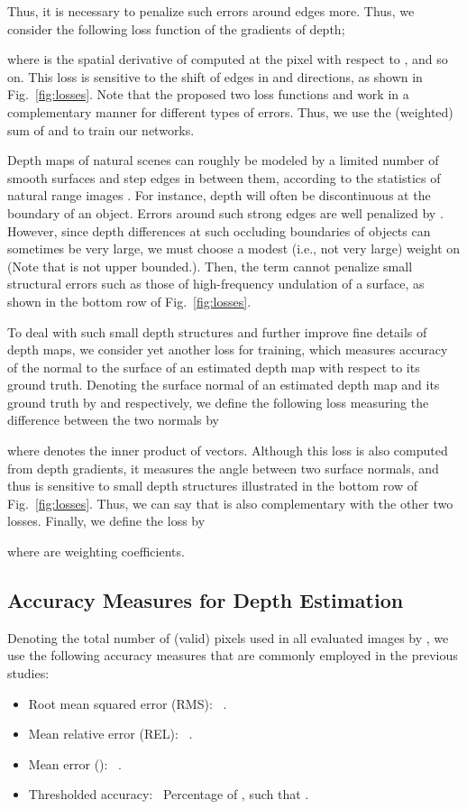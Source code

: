 \documentclass[10pt,twocolumn,letterpaper]{article}
\begin{document}
Thus, it is necessary to penalize such errors around edges more. Thus, we consider the following loss function of the gradients of depth;

where  is the spatial derivative of  computed at the  pixel with respect to , and so on. This loss is sensitive to the shift of edges in  and  directions, as shown in Fig.~\ref{fig:losses}. Note that the proposed two loss functions  and  work in a complementary manner for different types of errors. Thus, we use the (weighted) sum of  and  to train our networks. 

Depth maps of natural scenes can roughly be modeled by a limited number of smooth surfaces and step edges in between them, according to the statistics of natural range images \cite{huang2000statistics}. For instance, depth will often be discontinuous at the boundary of an object. Errors around such strong edges are well penalized by . However, since depth differences at such occluding boundaries of objects can sometimes be very large, we must choose a modest (i.e., not very large) weight  on  (Note that  is not upper bounded.). Then, the term  cannot penalize small structural errors such as those of high-frequency undulation of a surface, as shown in the bottom row of Fig.~\ref{fig:losses}.

To deal with such small depth structures and further improve fine details of depth maps, we consider yet another loss for training, which measures accuracy of the normal to the surface of an estimated depth map with respect to its ground truth. Denoting the surface normal of an estimated depth map and its ground truth by  and 
respectively, we define the following loss measuring the difference between the two normals by

where  denotes the inner product of vectors. 
Although this loss is also  computed from depth gradients, it measures the angle between two surface normals, and thus is sensitive to small depth structures illustrated in the bottom row of Fig.~\ref{fig:losses}. 
Thus, we can say that  is also complementary with the other two losses. Finally, we define the loss by

where  are weighting coefficients. 

\subsection{Accuracy Measures for Depth Estimation}
Denoting the total number of (valid) pixels used in all evaluated images by , we use the following accuracy measures that are commonly employed in the previous studies:
\begin{itemize} 
 \item Root mean squared error (RMS):~ .
 \item Mean relative error (REL):~ .
 \item Mean  error ():~ .
 \item Thresholded accuracy:~ Percentage of , such that .
\end{itemize}
\end{document}

